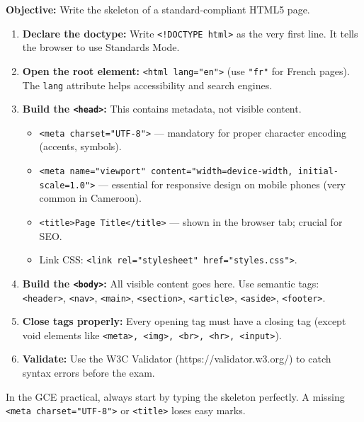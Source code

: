 \documentclass[11pt]{article}
\begin{document}
\begin{methode}
\textbf{Objective:} Write the skeleton of a standard-compliant HTML5 page.
\begin{enumerate}
    \item \textbf{Declare the doctype:} Write \texttt{<!DOCTYPE html>} as the very first line. It tells the browser to use Standards Mode.
    \item \textbf{Open the root element:} \texttt{<html lang="en">} (use \texttt{"fr"} for French pages). The \texttt{lang} attribute helps accessibility and search engines.
    \item \textbf{Build the \texttt{<head>}:} This contains metadata, not visible content.
        \begin{itemize}
            \item \texttt{<meta charset="UTF-8">} — mandatory for proper character encoding (accents, symbols).
            \item \texttt{<meta name="viewport" content="width=device-width, initial-scale=1.0">} — essential for responsive design on mobile phones (very common in Cameroon).
            \item \texttt{<title>Page Title</title>} — shown in the browser tab; crucial for SEO.
            \item Link CSS: \texttt{<link rel="stylesheet" href="styles.css">}.
        \end{itemize}
    \item \textbf{Build the \texttt{<body>}:} All visible content goes here. Use semantic tags: \texttt{<header>}, \texttt{<nav>}, \texttt{<main>}, \texttt{<section>}, \texttt{<article>}, \texttt{<aside>}, \texttt{<footer>}.
    \item \textbf{Close tags properly:} Every opening tag must have a closing tag (except void elements like \texttt{<meta>, <img>, <br>, <hr>, <input>}).
    \item \textbf{Validate:} Use the W3C Validator (https://validator.w3.org/) to catch syntax errors before the exam.
\end{enumerate}
\begin{aretenir}
In the GCE practical, always start by typing the skeleton perfectly. A missing \texttt{<meta charset="UTF-8">} or \texttt{<title>} loses easy marks.
\end{aretenir}
\end{methode}
\end{document}
